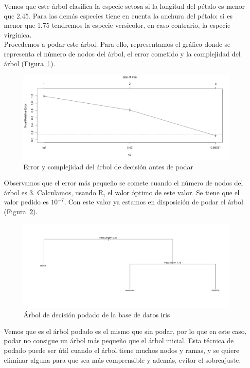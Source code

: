 \documentclass[12pt,a4paper,twoside,openright,titlepage,final]{article}
\begin{document}
Vemos que este árbol clasifica la especie setosa si la longitud del pétalo es menor que 2.45. Para las demás especies tiene en cuenta la anchura del pétalo: si es menor que 1.75 tendremos la especie versicolor, en caso contrario, la especie virginica.\\

Procedemos a podar este árbol. Para ello, representamos el gráfico donde se representa el número de nodos del árbol, el error cometido y la complejidad del árbol (Figura~\ref{fig:cp_plot}).\\

\begin{figure}[tbph!]
\centering
\includegraphics[width=0.8\linewidth]{imagenes/cp_plot}
\caption{Error y complejidad del árbol de decisión antes de podar}
\label{fig:cp_plot}
\end{figure}

Observamos que el error más pequeño se comete cuando el número de nodos del árbol es 3. Calculamos, usando R, el valor óptimo de este valor. Se tiene que el valor pedido es $10^{-7}$. Con este valor ya estamos en disposición de podar el árbol (Figura~\ref{fig:iris_arbol_podado}).\\

\begin{figure}[tbph!]
\centering
\includegraphics[width=0.9\linewidth]{imagenes/iris_arbol_podado}
\caption{Árbol de decisión podado de la base de datos iris}
\label{fig:iris_arbol_podado}
\end{figure}

Vemos que es el árbol podado es el mismo que sin podar, por lo que en este caso, podar no consigue un árbol más pequeño que el árbol inicial. Esta técnica de podado puede ser útil cuando el árbol tiene muchos nodos y ramas, y se quiere eliminar alguna para que sea más comprensible y además, evitar el sobreajuste. 
\end{document}
